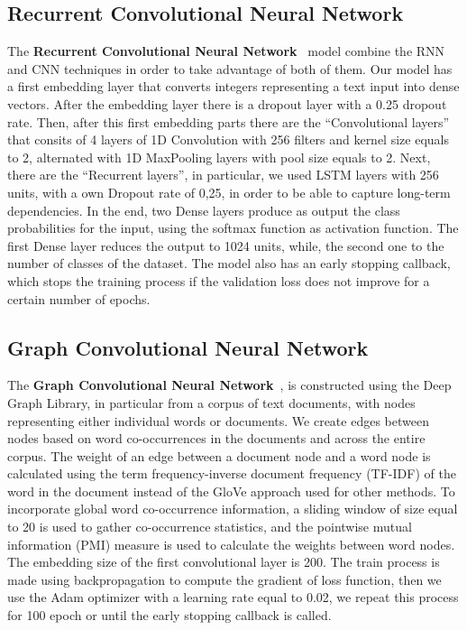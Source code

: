 \subsection{Recurrent Convolutional Neural Network}
The \textbf{Recurrent Convolutional Neural Network}~\cite{paper-text-classification-algorithms} model combine the RNN and CNN techniques in order to take advantage of both of them. Our model has a first embedding layer that converts integers representing a text input into dense vectors. After the embedding layer there is a dropout layer with a 0.25 dropout rate. Then, after this first embedding parts there are the “Convolutional layers” that consits of 4 layers of 1D Convolution with 256 filters and kernel size equals to 2, alternated with 1D MaxPooling  layers with pool size equals to 2. Next, there are the “Recurrent layers”, in particular, we used LSTM layers with 256 units, with a own Dropout rate of 0,25, in order to be able to capture long-term dependencies. In the end, two Dense layers produce as output the class probabilities for the input, using the softmax function as activation function. The first Dense layer reduces the output to 1024 units, while, the second one to the number of classes of the dataset. The model also has an early stopping callback, which stops the training process if the validation loss does not improve for a certain number of epochs.

\subsection{Graph Convolutional Neural Network}
The \textbf{Graph Convolutional Neural Network}~\cite{paper-graph-convolution-network}, is constructed using the Deep Graph Library, in particular from a corpus of text documents, with nodes representing either individual words or documents. We create edges between nodes based on word co-occurrences in the documents and across the entire corpus. The weight of an edge between a document node and a word node is calculated using the term frequency-inverse document frequency (TF-IDF) of the word in the document instead of the GloVe approach used for other methods. To incorporate global word co-occurrence information, a sliding window of size equal to 20 is used to gather co-occurrence statistics, and the pointwise mutual information (PMI) measure is used to calculate the weights between word nodes. The embedding size of the first convolutional layer is 200. The train process is made using backpropagation to compute the gradient of loss function, then we use the Adam optimizer with a learning rate equal to 0.02, we repeat this process for 100 epoch or until the early stopping callback is called. 
